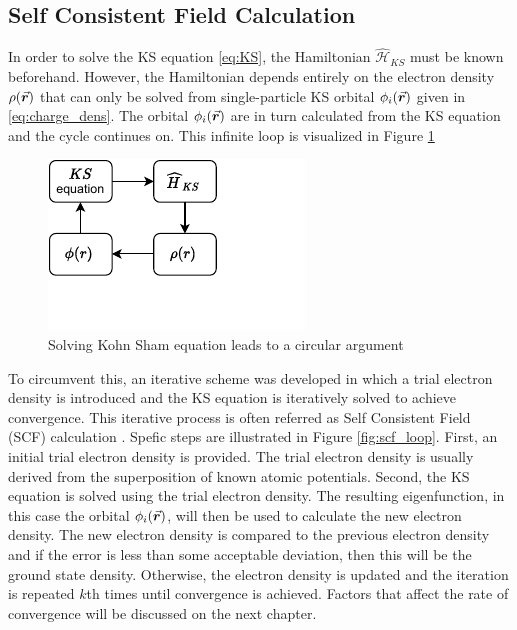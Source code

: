 \subsection{Self Consistent Field Calculation}
In order to solve the KS equation \eqref{eq:KS}, the Hamiltonian $\hat{\mathcal{H}}_{KS}$ must be known beforehand. However, the Hamiltonian depends entirely  on the electron density $\rho({\va*{r}})$ that can only be  solved from single-particle KS orbital $\phi_i(\va*{r})$ given in \eqref{eq:charge_dens}. The orbital $\phi_i(\va*{r})$ are in turn calculated from the KS equation and the cycle continues on. This infinite loop is visualized in Figure \ref{fig:KS_loop}

\begin{figure}[tbh!]
	\centering
	\includegraphics[width=0.3\linewidth]{"images/KS_loop"}
	\caption[Kohn Sham loop]{Solving Kohn Sham equation leads to a circular argument}
	\label{fig:KS_loop}
\end{figure}

To circumvent this, an iterative scheme was developed  in which a trial electron density is introduced and the KS equation is iteratively solved  to achieve convergence. This iterative process is often referred as Self Consistent Field (SCF) calculation \citep{Woods2019}. Spefic steps are illustrated in Figure \ref{fig:scf_loop}. First, an initial trial electron density is provided. The trial electron density is usually derived from the superposition of known atomic potentials. Second,    the KS equation is solved using the trial electron density. The resulting eigenfunction, in this case the orbital $\phi_i(\va*{r})$, will then be used to calculate the new electron density. The new electron density is compared to the previous electron density and if the error is less than some acceptable deviation, then this will be the ground state density. Otherwise, the electron density is updated and the iteration is repeated $k$th times until convergence is achieved. Factors that affect the rate of convergence will be discussed on the next chapter.

